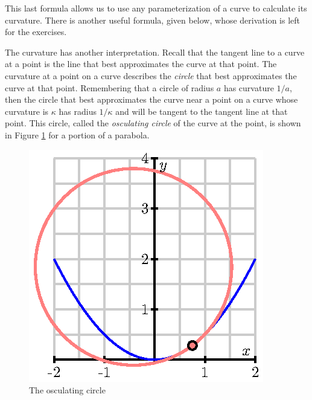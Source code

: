This last formula allows us to use any parameterization of a curve to
calculate its curvature. There is another useful formula, given
below, whose derivation is left for the exercises.

\vspace*{5pt}
\nin {}
\vspace*{5pt}




%

The curvature has another interpretation.  Recall that the tangent
line to a curve at a point is the line that best approximates the
curve at that point.  The curvature at a point on a curve describes
the {\em circle} that best approximates the curve at that point.
Remembering that a circle of radius $a$ has curvature $1/a$, then the
circle that best approximates the curve near a point on a curve whose
curvature is $\kappa$ has radius $1/\kappa$ and will be tangent to the
tangent line at that point.  This circle, called the {\em osculating
  circle} of the curve at the point, is shown in Figure
\ref{F:9.8.osculating} for a portion of a
parabola.

\begin{figure}[ht]
  \begin{center}
    \includegraphics{figures/fig_9_8_curvature.eps}
    \caption{The osculating circle}
    \label{F:9.8.osculating}
  \end{center}
\end{figure}

